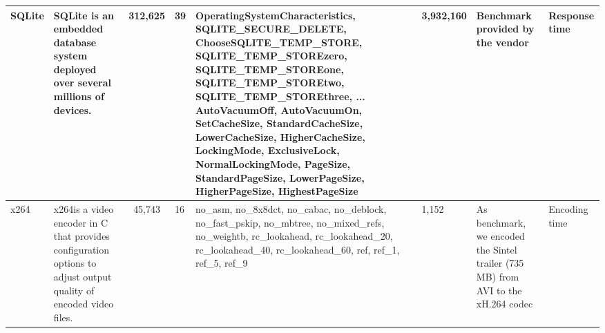 \documentclass[smallextended]{svjour3}       %
\begin{document}
\begin{table}[tbh]
{\begin{tabular}{p{1.05cm}p{1.5cm}cp{0.35cm}p{4cm}p{.8cm}p{2cm}p{1cm}}
SQLite                                                                    & SQLite is an embedded database system deployed over several millions of devices.                                 & 312,625 & 39       & OperatingSystemCharacteristics, SQLITE\_SECURE\_DELETE, ChooseSQLITE\_TEMP\_STORE, SQLITE\_TEMP\_STOREzero, SQLITE\_TEMP\_STOREone, SQLITE\_TEMP\_STOREtwo, SQLITE\_TEMP\_STOREthree, ... AutoVacuumOff, AutoVacuumOn, SetCacheSize, StandardCacheSize, LowerCacheSize, HigherCacheSize, LockingMode, ExclusiveLock, NormalLockingMode, PageSize, StandardPageSize, LowerPageSize, HigherPageSize, HighestPageSize & 3,932,160         & Benchmark provided by the vendor                                                                                                                           & Response time                                                \\ \hline
x264                                                                      & x264is a video encoder in C that provides configuration options to adjust output quality of encoded video files. & 45,743  & 16       & no\_asm, no\_8x8dct, no\_cabac, no\_deblock, no\_fast\_pskip, no\_mbtree, no\_mixed\_refs, no\_weightb, rc\_lookahead, rc\_lookahead\_20, rc\_lookahead\_40, rc\_lookahead\_60, ref, ref\_1, ref\_5, ref\_9                                                                                                                                                                                                                                                                                                                                                                                                                                                                                                                                                                                                                                                             & 1,152             & As benchmark, we encoded the Sintel trailer (735 MB) from AVI to the xH.264 codec                                                                          & Encoding time                                                \\ \hline
\end{tabular}

}

\label{fig:systems}
\end{table}
\end{document}
